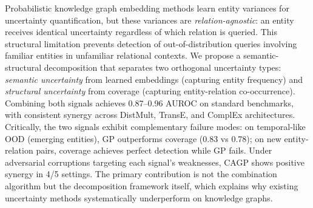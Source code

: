 
Probabilistic knowledge graph embedding methods learn entity variances for uncertainty quantification, but these variances are \emph{relation-agnostic}: an entity receives identical uncertainty regardless of which relation is queried.
This structural limitation prevents detection of out-of-distribution queries involving familiar entities in unfamiliar relational contexts.
We propose a semantic-structural decomposition that separates two orthogonal uncertainty types: \emph{semantic uncertainty} from learned embeddings (capturing entity frequency) and \emph{structural uncertainty} from coverage (capturing entity-relation co-occurrence).
Combining both signals achieves 0.87--0.96 AUROC on standard benchmarks, with consistent synergy across DistMult, TransE, and ComplEx architectures.
Critically, the two signals exhibit complementary failure modes: on temporal-like OOD (emerging entities), GP outperforms coverage (0.83 vs 0.78); on new entity-relation pairs, coverage achieves perfect detection while GP fails.
Under adversarial corruptions targeting each signal's weaknesses, CAGP shows positive synergy in 4/5 settings.
The primary contribution is not the combination algorithm but the decomposition framework itself, which explains why existing uncertainty methods systematically underperform on knowledge graphs.
